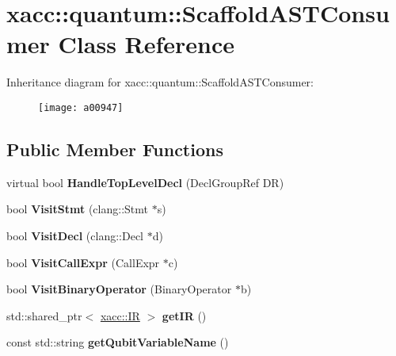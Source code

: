 \hypertarget{a00947}{}\section{xacc\+:\+:quantum\+:\+:Scaffold\+A\+S\+T\+Consumer Class Reference}
\label{a00947}
Inheritance diagram for xacc\+:\+:quantum\+:\+:Scaffold\+A\+S\+T\+Consumer\+:\begin{figure}[H]
\begin{center}
\leavevmode
\texttt{[image: a00947]}
\end{center}
\end{figure}
\subsection*{Public Member Functions}
\begin{DoxyCompactItemize}
\item 
\mbox{\label{a00947_ae846fd40684f3a1f820b8711e1204089}} 
virtual bool {\bfseries Handle\+Top\+Level\+Decl} (Decl\+Group\+Ref DR)
\item 
\mbox{\label{a00947_a6693c27f68332d8142fbdcb405e3259b}} 
bool {\bfseries Visit\+Stmt} (clang\+::\+Stmt $\ast$s)
\item 
\mbox{\label{a00947_ae6a05fe567cd8ea15feb694dbb898c33}} 
bool {\bfseries Visit\+Decl} (clang\+::\+Decl $\ast$d)
\item 
\mbox{\label{a00947_a1478fc9e887b04d2ad2aa8347ef6bbcb}} 
bool {\bfseries Visit\+Call\+Expr} (Call\+Expr $\ast$c)
\item 
\mbox{\label{a00947_a3f2f070888678caf53e57041b4f5ddd6}} 
bool {\bfseries Visit\+Binary\+Operator} (Binary\+Operator $\ast$b)
\item 
\mbox{\label{a00947_af9dbfa7c52b8a7de99132257e154e29a}} 
std\+::shared\+\_\+ptr$<$ \hyperlink{a01175}{xacc\+::\+IR} $>$ {\bfseries get\+IR} ()
\item 
\mbox{\label{a00947_aa301f0bcae6fb5a1c17557ba08144cb4}} 
const std\+::string {\bfseries get\+Qubit\+Variable\+Name} ()
\end{DoxyCompactItemize}
